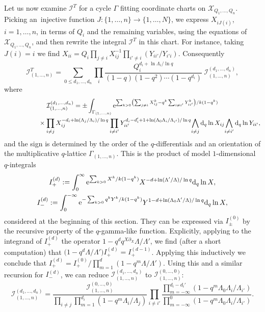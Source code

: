 \documentclass[10pt,a4paper]{amsart}
\numberwithin{equation}{section}
\def\I{\mathcal I}
\def\X{\mathcal X}
\def\p{\partial}
\theoremstyle{definition}
\theoremstyle{plain}
\begin{document}
Let us now examine $\I^T$ for a cycle $\Gamma$ fitting coordinate charts on $\X_{Q_1,\dots,Q_n}$. Picking an~injec\-tive function $J\colon \{ 1,\dots, n\} \to \{1,\dots, N\}$, we express $X_{iJ(i)}$, $i=1,\dots,n$, in terms of $Q_i$ and the remaining variables, using the equations of $\X_{Q_1,\dots,Q_n}$, and then rewrite the integral $\I^T$ in this chart. For instance, taking $J(i)=i$
we find $X_{ii}=Q_i\prod_{j\neq i}X_{ij}^{-1}\prod_{i'\neq i}(Y_{ii'}/Y_{i'i})$. Consequently
\[
\I^T_{(1,\dots,n)}=\sum_{0\leq d_1,\dots,d_n}\prod_i \frac{Q_i^{d_i+\ln \Lambda_i/\ln q}}{(1-q)(1-q^2)\cdots (1-q^{d_i})}\ \I^{(d_1,\dots,d_n)}_{(1,\dots,n)},
\]
where
\begin{gather*}
\I^{(d_1,\dots,d_n)}_{(1,\dots,n)}=\pm \int_{\Gamma_{(1,\dots,n)}} {\rm e}^{ \sum_{k>0} \left(\sum_{j\neq i}X_{ij}^k-q^k\sum_{i\neq i'}Y_{ii'}^k\right)/k(1-q^k)}
\\ \hphantom{\I^{(d_1,\dots,d_n)}_{(1,\dots,n)}=}
{}\times\prod_{i\neq j} X_{ij}^{-d_i+\ln (\Lambda_j/\Lambda_i)/\ln q} \prod_{i\neq i'} Y_{ii'}^{d_i-d_i'+1+\ln (\Lambda_0\Lambda_i/\Lambda_{i'})/\ln q} \!\bigwedge_{i\neq j} {\rm d}_q\ln X_{ij} \!\bigwedge_{i\neq i'} {\rm d}_q\ln Y_{ii'},
\end{gather*}
and the sign is determined by the order of the $q$-differentials and an orientation of the multiplicative $q$-lattice $\Gamma_{(1,\dots,n)}$. This is the product
of model $1$-dimensional $q$-integrals
\begin{gather*}
I^{(d)}_{+}:=\int_0^{\infty} {\rm e}^{ \sum_{k>0}X^k/k(1-q^k)} X^{-d+\ln (\Lambda'/\Lambda)/\ln q} {\rm d}_q\ln X,
\\
I^{(d)}_{-}:=\int_0^{-\infty} {\rm e}^{ -\sum_{k>0}q^kY^k/k(1-q^k)} Y^{1-d+\ln (\Lambda_0\Lambda'/\Lambda)/\ln q} {\rm d}_q\ln X,
\end{gather*}
considered at the beginning of this section. They can be expressed via $I_{\pm}^{(0)}$ by the recursive property of the $q$-gamma-like function. Explicitly, applying to the integrand of $I^{(d)}_{+}$ the operator $1-q^d q^{ X\p_X}\Lambda/\Lambda'$, we find (after a short computation) that $\big(1-q^d\Lambda/\Lambda'\big) I_{+}^{(d)} = I^{(d-1)}_{+}$. Applying this inductively we conclude that $I_{+}^{(d)} = I_{+}^{(0)}/\prod_{m=1}^d (1-q^m\Lambda/\Lambda')$. Using this and a similar recursion for $I^{(d)}_{-}$, we can reduce $\I^{(d_1,\dots,d_n)}_{(1,\dots,n)}$ to $\I^{(0,\dots,0)}_{(1,\dots,n)}$:
\[
\I^{(d_1,\dots,d_n)}_{(1,\dots,n)}=\frac{\I^{(0,\dots,0)}_{(1,\dots,n)}}
{ \prod_{i\neq j}\prod_{m=1}^{d_i}(1-q^m\Lambda_i/\Lambda_j)} \prod_{i\neq i'} \frac{\prod_{m=-\infty}^{d_i-d_i'}(1-q^m\Lambda_0\Lambda_i/\Lambda_{i'})}
{\prod_{m=-\infty}^0(1-q^m\Lambda_0\Lambda_i/\Lambda_{i'})}.
\]
\end{document}
